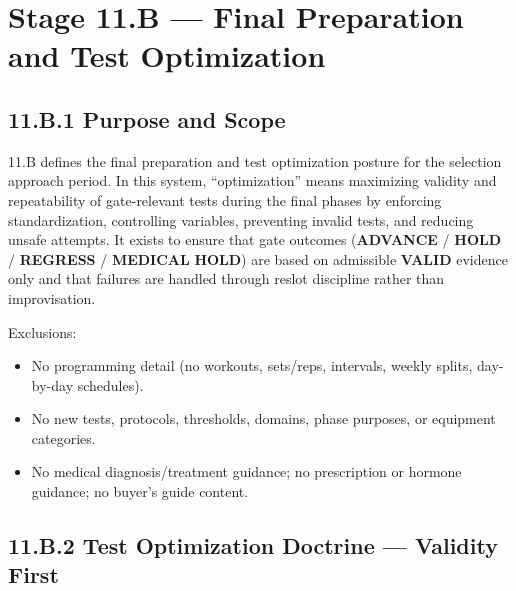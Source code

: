 \documentclass[10pt]{article}
\begin{document}
\section*{Stage 11.B — Final Preparation and Test Optimization}
{}

\subsection*{11.B.1 Purpose and Scope}
{}

11.B defines the final preparation and test optimization posture for the selection approach period. In this system, “optimization” means maximizing validity and repeatability of gate-relevant tests during the final phases by enforcing standardization, controlling variables, preventing invalid tests, and reducing unsafe attempts. It exists to ensure that gate outcomes (\textbf{ADVANCE} / \textbf{HOLD} / \textbf{REGRESS} / \textbf{MEDICAL} \textbf{HOLD}) are based on admissible \textbf{VALID} evidence only and that failures are handled through reslot discipline rather than improvisation.

Exclusions:

\begin{itemize}
\item No programming detail (no workouts, sets/reps, intervals, weekly splits, day-by-day schedules).
\item No new tests, protocols, thresholds, domains, phase purposes, or equipment categories.
\item No medical diagnosis/treatment guidance; no prescription or hormone guidance; no buyer’s guide content.
\end{itemize}

\newpage
\subsection*{11.B.2 Test Optimization Doctrine — Validity First}
{}
\end{document}
